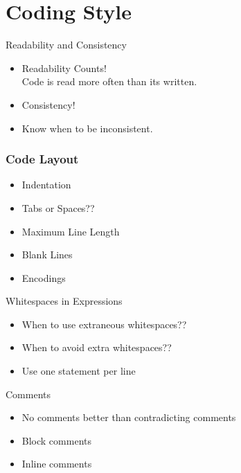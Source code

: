\documentclass[14pt,compress]{beamer}
\begin{document}

\section{Coding Style}
\begin{frame}{Readability and Consistency}
    \begin{itemize}
        \item Readability Counts!\\Code is read more often than its written.
        \item Consistency!
        \item Know when to be inconsistent.
      \end{itemize}
\end{frame}

\begin{frame}[fragile]
  \frametitle{Code Layout}
  \begin{itemize}
        \item Indentation
        \item Tabs or Spaces??
        \item Maximum Line Length
        \item Blank Lines
        \item Encodings
   \end{itemize}
\end{frame}

\begin{frame}{Whitespaces in Expressions}
  \begin{itemize}
        \item When to use extraneous whitespaces??
        \item When to avoid extra whitespaces??
        \item Use one statement per line
   \end{itemize}
\end{frame}

\begin{frame}{Comments}
  \begin{itemize}
        \item No comments better than contradicting comments
        \item Block comments
        \item Inline comments
   \end{itemize}
\end{frame}
\end{document}

